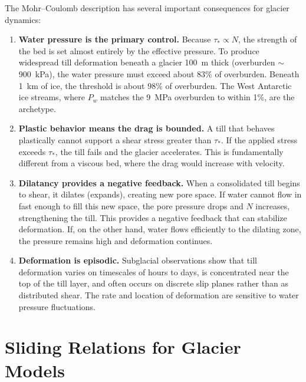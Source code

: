 \documentclass[11pt]{article}
\begin{document}
The Mohr--Coulomb description has several important consequences for glacier dynamics:

\begin{enumerate}
  \item \textbf{Water pressure is the primary control.}  Because $\tau_* \propto N$, the strength of the bed is set almost entirely by the effective pressure.  To produce widespread till deformation beneath a glacier 100~m thick (overburden $\sim$900~kPa), the water pressure must exceed about 83\% of overburden.  Beneath 1~km of ice, the threshold is about 98\% of overburden.  The West Antarctic ice streams, where $P_w$ matches the 9~MPa overburden to within 1\%, are the archetype.

  \item \textbf{Plastic behavior means the drag is bounded.}  A till that behaves plastically cannot support a shear stress greater than $\tau_*$.  If the applied stress exceeds $\tau_*$, the till fails and the glacier accelerates.  This is fundamentally different from a viscous bed, where the drag would increase with velocity.

  \item \textbf{Dilatancy provides a negative feedback.}  When a consolidated till begins to shear, it dilates (expands), creating new pore space.  If water cannot flow in fast enough to fill this new space, the pore pressure drops and $N$ increases, strengthening the till.  This provides a negative feedback that can stabilize deformation.  If, on the other hand, water flows efficiently to the dilating zone, the pressure remains high and deformation continues.

  \item \textbf{Deformation is episodic.}  Subglacial observations show that till deformation varies on timescales of hours to days, is concentrated near the top of the till layer, and often occurs on discrete slip planes rather than as distributed shear.  The rate and location of deformation are sensitive to water pressure fluctuations.
\end{enumerate}

\section{Sliding Relations for Glacier Models}
\label{sec:sliding_laws}
\end{document}
